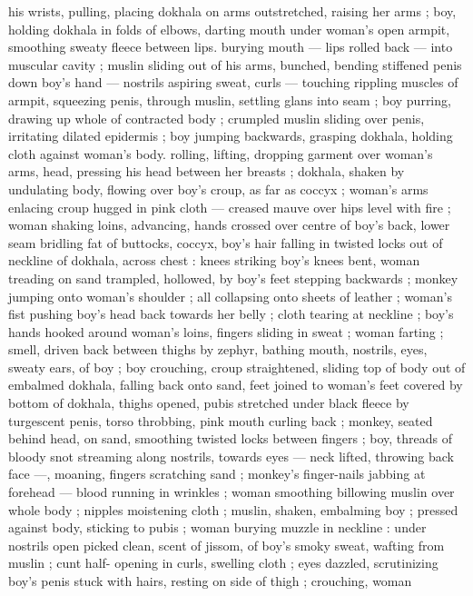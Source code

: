 his wrists, pulling, placing dokhala on arms outstretched, raising her
arms ; boy, holding dokhala in folds of elbows, darting mouth under
woman's open armpit, smoothing sweaty fleece between lips.
burying mouth --- lips rolled back --- into muscular cavity ; muslin
sliding out of his arms, bunched, bending stiffened penis down boy's
hand --- nostrils aspiring sweat, curls --- touching rippling muscles
of armpit, squeezing penis, through muslin, settling glans into seam
; boy purring, drawing up whole of contracted body ; crumpled
muslin sliding over penis, irritating dilated epidermis ; boy jumping
backwards, grasping dokhala, holding cloth against woman's body.
rolling, lifting, dropping garment over woman's arms, head, pressing
his head between her breasts ; dokhala, shaken by undulating body,
flowing over boy's croup, as far as coccyx ; woman's arms enlacing
croup hugged in pink cloth --- creased mauve over hips level with fire
; woman shaking loins, advancing, hands crossed over centre of
boy's back, lower seam bridling fat of buttocks, coccyx, boy's hair
falling in twisted locks out of neckline of dokhala, across chest :
knees striking boy's knees bent, woman treading on sand trampled,
hollowed, by boy's feet stepping backwards ; monkey jumping onto
woman's shoulder ; all collapsing onto sheets of leather ; woman's
fist pushing boy's head back towards her belly ; cloth tearing at
neckline ; boy's hands hooked around woman's loins, fingers sliding
in sweat ; woman farting ; smell, driven back between thighs by
zephyr, bathing mouth, nostrils, eyes, sweaty ears, of boy ; boy
crouching, croup straightened, sliding top of body out of embalmed
dokhala, falling back onto sand, feet joined to woman's feet covered
by bottom of dokhala, thighs opened, pubis stretched under black
fleece by turgescent penis, torso throbbing, pink mouth curling back
; monkey, seated behind head, on sand, smoothing twisted locks
between fingers ; boy, threads of bloody snot streaming along
nostrils, towards eyes --- neck lifted, throwing back face ---,
moaning, fingers scratching sand ; monkey's finger-nails jabbing at
forehead --- blood running in wrinkles ; woman smoothing billowing
muslin over whole body ; nipples moistening cloth ; muslin, shaken,
embalming boy ; pressed against body, sticking to pubis ; woman
burying muzzle in neckline : under nostrils open picked clean, scent
of jissom, of boy's smoky sweat, wafting from muslin ; cunt half-
opening in curls, swelling cloth ; eyes dazzled, scrutinizing boy's
penis stuck with hairs, resting on side of thigh ; crouching, woman
